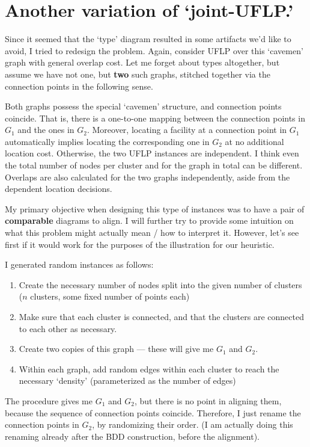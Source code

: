 \documentclass[11pt]{article}
\begin{document}
\section{Another variation of `joint-UFLP.'}
\label{sec:org40b5f8e}
Since it seemed that the `type' diagram resulted in some artifacts we'd like to
avoid, I tried to redesign the problem. Again, consider UFLP over this ‘cavemen’
graph with general overlap cost. Let me forget about types altogether, but
assume we have not one, but \textbf{two} such graphs, stitched together via the
connection points in the following sense.

Both graphs possess the special ‘cavemen’ structure, and connection points
coincide. That is, there is a one-to-one mapping between the connection points
in \(G_1\) and the ones in \(G_2\). Moreover, locating a facility at a connection
point in \(G_1\) automatically implies locating the corresponding one in \(G_2\) at
no additional location cost. Otherwise, the two UFLP instances are independent.
I think even the total number of nodes per cluster and for the graph in total
can be different. Overlaps are also calculated for the two graphs independently,
aside from the dependent location decisions.

My primary objective when designing this type of instances was to have a pair of
\textbf{comparable} diagrams to align. I will further try to provide some intuition on
what this problem might actually mean / how to interpret it. However, let’s see
first if it would work for the purposes of the illustration for our heuristic.

I generated random instances as follows:
\begin{enumerate}
\item Create the necessary number of nodes split into the given number of clusters (\(n\) clusters, some fixed number of points each)
\item Make sure that each cluster is connected, and that the clusters are connected to each other as necessary.
\item Create two copies of this graph — these will give me \(G_1\) and \(G_2\).
\item Within each graph, add random edges within each cluster to reach the necessary ‘density’ (parameterized as the number of edges)
\end{enumerate}

The procedure gives me \(G_1\) and \(G_2\), but there is no point in aligning them,
because the sequence of connection points coincide. Therefore, I just rename the
connection points in \(G_2\), by randomizing their order. (I am actually doing
this renaming already after the BDD construction, before the alignment).
\end{document}
